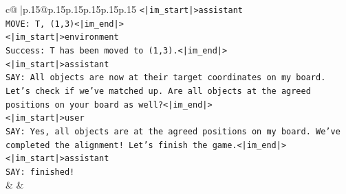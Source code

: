 \documentclass{article}
\begin{document}
{\begin{supertabular}{c@{$\;$}|p{.15\linewidth}@{}p{.15\linewidth}p{.15\linewidth}p{.15\linewidth}p{.15\linewidth}p{.15\linewidth}}
{{{\texttt{<|im\_start|>assistant} \\
\texttt{MOVE: T, (1,3)<|im\_end|>} \\
\texttt{<|im\_start|>environment} \\
\texttt{Success: T has been moved to (1,3).<|im\_end|>} \\
\texttt{<|im\_start|>assistant} \\
\texttt{SAY: All objects are now at their target coordinates on my board. Let's check if we've matched up. Are all objects at the agreed positions on your board as well?<|im\_end|>} \\
\texttt{<|im\_start|>user} \\
\texttt{SAY: Yes, all objects are at the agreed positions on my board. We've completed the alignment! Let's finish the game.<|im\_end|>} \\
\texttt{<|im\_start|>assistant} \\
\texttt{SAY: finished!} \\
            }
        }
    }
    & & \\ \\


\end{supertabular}}
\end{document}
